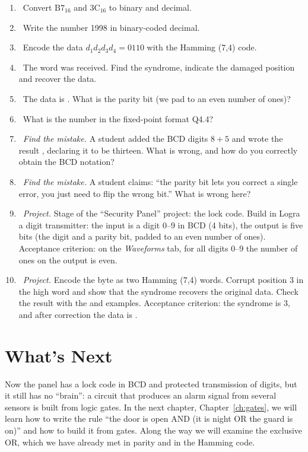 \begin{taskbox}
\begin{enumerate}
  \item {}~Convert $\text{B7}_{16}$ and $\text{3C}_{16}$ to binary and decimal.
  \item {}~Write the number 1998 in binary-coded decimal.
  \item {}~Encode the data $d_1d_2d_3d_4 = 0110$ with the Hamming (7,4) code.
  \item {}~The word  was received. Find the syndrome, indicate the damaged position and recover the data.
  \item {}~The data is . What is the parity bit (we pad to an even number of ones)?
  \item {}~What is the number  in the fixed-point format Q4.4?
  \item {}~\emph{Find the mistake.} A student added the BCD digits $8+5$ and wrote the result , declaring it to be thirteen. What is wrong, and how do you correctly obtain the BCD notation?
  \item {}~\emph{Find the mistake.} A student claims: ``the parity bit lets you correct a single error, you just need to flip the wrong bit.'' What is wrong here?
  \item {}~\emph{Project.} Stage of the ``Security Panel'' project: the lock code. Build in Logra a digit transmitter: the input is a digit 0--9 in BCD (4 bits), the output is five bits (the digit and a parity bit, padded to an even number of ones). Acceptance criterion: on the \emph{Waveforms} tab, for all digits 0--9 the number of ones on the output is even.
  \item {}~\emph{Project.} Encode the byte  as two Hamming (7,4) words. Corrupt position 3 in the high word and show that the syndrome recovers the original data. Check the result with the  and  examples. Acceptance criterion: the syndrome is 3, and after correction the data is .
\end{enumerate}
\end{taskbox}

\section{What's Next}

Now the panel has a lock code in BCD and protected transmission of digits, but
it still has no ``brain'': a circuit that produces an alarm signal from several
sensors is built from logic gates. In the next chapter, Chapter~\ref{ch:gates},
we will learn how to write the rule ``the door is open AND (it is night OR the guard is on)''
and how to build it from gates. Along the way we will examine the exclusive OR, which we
have already met in parity and in the Hamming code.
